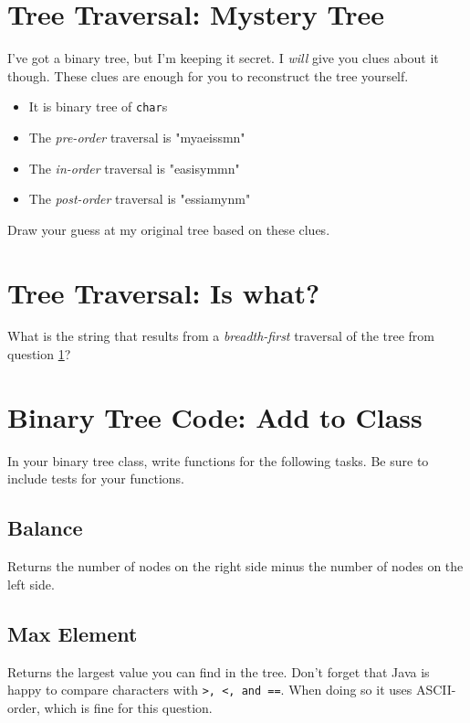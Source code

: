 \documentclass[twoside=false,DIV=14]{scrartcl}
\begin{document}
\section{Tree Traversal: Mystery Tree}
\label{sec:submission}

I've got a binary tree, but I'm keeping it secret.  I \emph{will} give you clues about it though.  These clues are enough for you to reconstruct the tree yourself.
\begin{itemize}
\item It is binary tree of \verb+char+s
\item The \emph{ pre-order} traversal is "myaeissmn"
\item The \emph{in-order} traversal is "easisymmn"
\item The \emph{post-order} traversal is "essiamynm"
\end{itemize}

Draw your guess at my original tree based on these clues.

\section{Tree Traversal: Is what?} 
What is the string that results from a \emph{breadth-first} traversal of the tree from question \ref{sec:submission}?

\section{Binary Tree Code: Add to Class}   
In your binary tree class, write functions for the following tasks.  Be sure to include tests for your functions.

\subsection{Balance}
 Returns the number of nodes on the right side minus the number of nodes on the left side.
\subsection{Max Element}
 Returns the largest value you can find in the tree.  Don't forget that Java is happy to compare characters with \verb+>, <, and ==+.  When doing so it uses ASCII-order, which is fine for this question.
\end{document}
